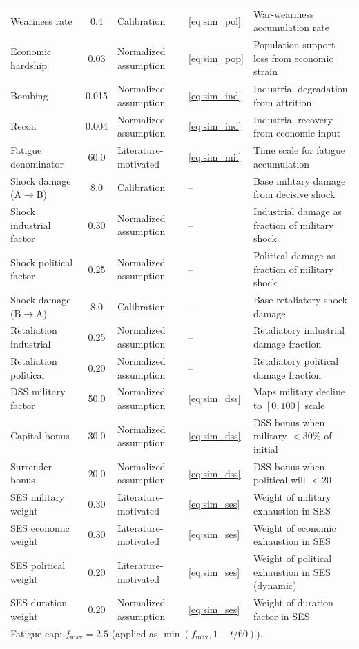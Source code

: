 \begin{table}[H]
\begin{tabularx}{\textwidth}{@{}l c l l X@{}}
Weariness rate & 0.4 & Calibration & \ref{eq:sim_pol} & War-weariness accumulation rate \\
Economic hardship & 0.03 & Normalized assumption & \ref{eq:sim_pop} & Population support loss from economic strain \\
Bombing & 0.015 & Normalized assumption & \ref{eq:sim_ind} & Industrial degradation from attrition \\
Recon & 0.004 & Normalized assumption & \ref{eq:sim_ind} & Industrial recovery from economic input \\
Fatigue denominator & 60.0 & Literature-motivated & \ref{eq:sim_mil} & Time scale for fatigue accumulation \citep{heyer2017} \\
Shock damage (A$\to$B) & 8.0 & Calibration & -- & Base military damage from decisive shock \\
Shock industrial factor & 0.30 & Normalized assumption & -- & Industrial damage as fraction of military shock \\
Shock political factor & 0.25 & Normalized assumption & -- & Political damage as fraction of military shock \\
Shock damage (B$\to$A) & 8.0 & Calibration & -- & Base retaliatory shock damage \\
Retaliation industrial & 0.25 & Normalized assumption & -- & Retaliatory industrial damage fraction \\
Retaliation political & 0.20 & Normalized assumption & -- & Retaliatory political damage fraction \\
DSS military factor & 50.0 & Normalized assumption & \ref{eq:sim_dss} & Maps military decline to $[0, 100]$ scale \\
Capital bonus & 30.0 & Normalized assumption & \ref{eq:sim_dss} & DSS bonus when military $< 30\%$ of initial \\
Surrender bonus & 20.0 & Normalized assumption & \ref{eq:sim_dss} & DSS bonus when political will $< 20$ \\
SES military weight & 0.30 & Literature-motivated & \ref{eq:sim_ses} & Weight of military exhaustion in SES \citep{lanchester1916} \\
SES economic weight & 0.30 & Literature-motivated & \ref{eq:sim_ses} & Weight of economic exhaustion in SES \citep{organski1961} \\
SES political weight & 0.20 & Literature-motivated & \ref{eq:sim_ses} & Weight of political exhaustion in SES (dynamic) \citep{bennett1998} \\
SES duration weight & 0.20 & Normalized assumption & \ref{eq:sim_ses} & Weight of duration factor in SES \\
\midrule
\multicolumn{5}{l}{\footnotesize Fatigue cap: $f_{\max} = 2.5$ (applied as $\min(f_{\max}, 1 + t/60)$).} \\
\bottomrule
\end{tabularx}
\end{table}

